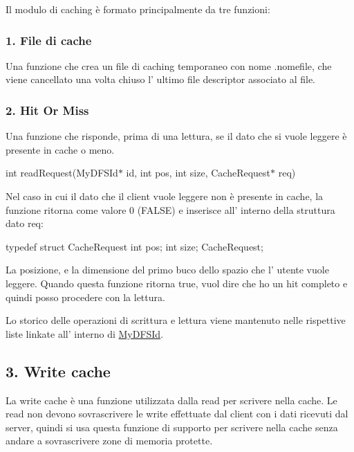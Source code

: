 Il modulo di caching è formato principalmente da tre funzioni\+:

\subsubsection*{1. File di cache}

Una funzione che crea un file di caching temporaneo con nome .nomefile, che viene cancellato una volta chiuso l' ultimo file descriptor associato al file.

\subsubsection*{2. Hit Or Miss}

Una funzione che risponde, prima di una lettura, se il dato che si vuole leggere è presente in cache o meno.

int read\+Request(\+My\+D\+F\+S\+Id$\ast$ id, int pos, int size, Cache\+Request$\ast$ req)

Nel caso in cui il dato che il client vuole leggere non è presente in cache, la funzione ritorna come valore 0 (F\+A\+L\+S\+E) e inserisce all' interno della struttura dato req\+: \begin{DoxyVerb}typedef struct CacheRequest {
    int pos;
    int size;
}CacheRequest;
\end{DoxyVerb}
 La posizione, e la dimensione del primo buco dello spazio che l' utente vuole leggere. Quando questa funzione ritorna true, vuol dire che ho un hit completo e quindi posso procedere con la lettura.

Lo storico delle operazioni di scrittura e lettura viene mantenuto nelle rispettive liste linkate all' interno di \hyperlink{structMyDFSId}{My\+D\+F\+S\+Id}.

\subsection*{3. Write cache}

La write cache è una funzione utilizzata dalla read per scrivere nella cache. Le read non devono sovrascrivere le write effettuate dal client con i dati ricevuti dal server, quindi si usa questa funzione di supporto per scrivere nella cache senza andare a sovrascrivere zone di memoria protette. 